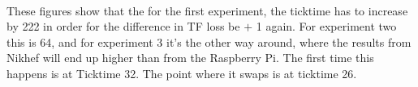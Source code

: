 \documentclass{report}
\begin{document}
\begin{table}[!htbp]
\caption{Slope and Intercepts combined experiments}
\label{table:SlopeInt}
\end{table}

\newpage

~\\These figures show that the for the first experiment, the ticktime has to increase by 222 in order for the difference in TF loss be $+$ 1 again. For experiment two this is 64, and for experiment 3 it's the other way around, where the results from Nikhef will end up higher than from the Raspberry Pi. The first time this happens is at Ticktime 32. The point where it swaps is at ticktime 26. 
\end{document}
